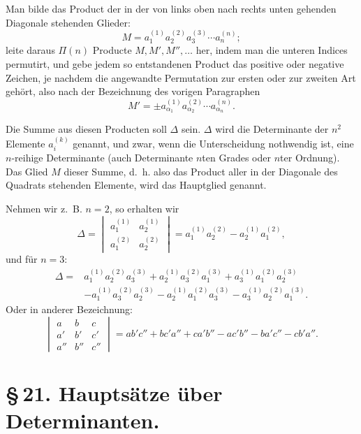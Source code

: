 \documentclass[11pt]{article}
\begin{document}
Man bilde das Product der in der von links oben nach rechts unten gehenden Diagonale stehenden Glieder:
\begin{equation}
M=a_1^{(1)}a_2^{(2)}a_3^{(3)}\cdots a_n^{(n)};
\tag{2}
\end{equation}
leite daraus \(\Pi(n)\) Producte \(M,M',M'',\ldots\) her, indem man die unteren Indices permutirt, und gebe jedem so entstandenen Product das positive oder negative Zeichen, je nachdem die angewandte Permutation zur ersten oder zur zweiten Art gehört, also nach der Bezeichnung des vorigen Paragraphen
\begin{equation}
M'=\pm a_{\alpha_1}^{(1)}a_{\alpha_2}^{(2)}\cdots a_{\alpha_n}^{(n)}.
\tag{3}
\end{equation}

Die Summe aus diesen Producten soll \(\Delta\) sein. \(\Delta\) wird die Determinante der \(n^2\) Elemente \(a_i^{(k)}\) genannt, und zwar, wenn die Unterscheidung nothwendig ist, eine \(n\)-reihige Determinante (auch Determinante \(n\)ten Grades oder \(n\)ter Ordnung). Das Glied \(M\) dieser Summe, d.~h. also das Product aller in der Diagonale des Quadrats stehenden Elemente, wird das Hauptglied genannt.

Nehmen wir z.~B. \(n=2\), so erhalten wir
\begin{equation}
\Delta=
\begin{vmatrix}
a_1^{(1)}&a_2^{(1)}\\
a_1^{(2)}&a_2^{(2)}
\end{vmatrix}
=a_1^{(1)}a_2^{(2)}-a_2^{(1)}a_1^{(2)},
\tag{4}
\end{equation}
und für \(n=3\):
\begin{equation}
\begin{aligned}
\Delta={}&a_1^{(1)}a_2^{(2)}a_3^{(3)}
+a_2^{(1)}a_3^{(2)}a_1^{(3)}
+a_3^{(1)}a_1^{(2)}a_2^{(3)}\\
&-a_1^{(1)}a_3^{(2)}a_2^{(3)}
-a_2^{(1)}a_1^{(2)}a_3^{(3)}
-a_3^{(1)}a_2^{(2)}a_1^{(3)}.
\end{aligned}
\tag{5}
\end{equation}
Oder in anderer Bezeichnung:
\begin{equation}
\begin{vmatrix}
a&b&c\\
a'&b'&c'\\
a''&b''&c''
\end{vmatrix}
=ab'c''+bc'a''+ca'b''-ac'b''-ba'c''-cb'a''.
\tag{6}
\end{equation}

\section*{\S\,21. Hauptsätze über Determinanten.}
\end{document}

